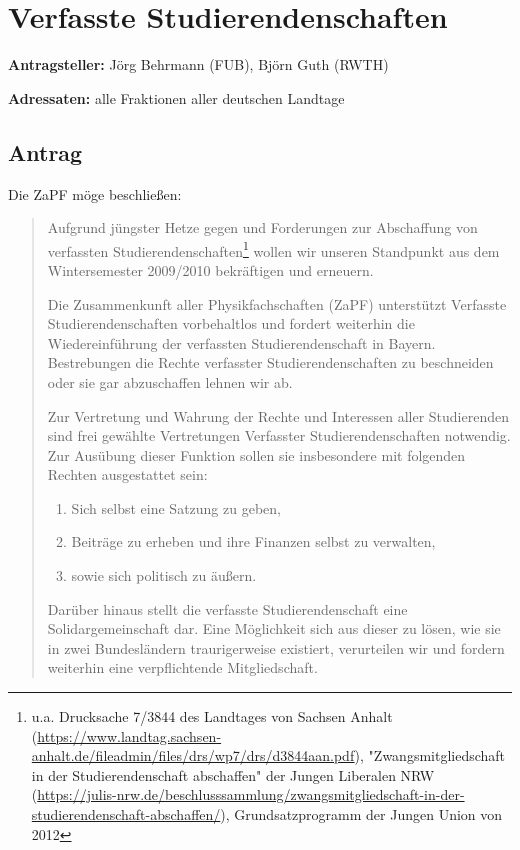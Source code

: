 \documentclass[draft,10pt,oneside]{scrartcl}
\begin{document}
\section*{Verfasste Studierendenschaften}

\textbf{Antragsteller:} Jörg Behrmann (FUB), Björn Guth (RWTH)

\textbf{Adressaten:} alle Fraktionen aller deutschen Landtage

\subsection*{Antrag}

Die ZaPF möge beschließen:

\begin{quote}
  Aufgrund jüngster Hetze gegen und Forderungen zur Abschaffung von verfassten
  Studierendenschaften\footnote{u.a. Drucksache 7/3844 des Landtages von Sachsen
    Anhalt
    (\url{https://www.landtag.sachsen-anhalt.de/fileadmin/files/drs/wp7/drs/d3844aan.pdf}),
  "Zwangsmitgliedschaft in der Studierendenschaft abschaffen" der Jungen
  Liberalen NRW
  (\url{https://julis-nrw.de/beschlusssammlung/zwangsmitgliedschaft-in-der-studierendenschaft-abschaffen/}),
  Grundsatzprogramm der Jungen Union von 2012}
  wollen wir unseren Standpunkt aus dem Wintersemester 2009/2010 bekräftigen und
  erneuern.

  Die Zusammenkunft aller Physikfachschaften (ZaPF) unterstützt Verfasste
  Studierendenschaften vorbehaltlos und fordert weiterhin die Wiedereinführung
  der verfassten Studierendenschaft in Bayern. Bestrebungen die Rechte
  verfasster Studierendenschaften zu beschneiden oder sie gar abzuschaffen
  lehnen wir ab.

  Zur Vertretung und Wahrung der Rechte und Interessen aller Studierenden sind
  frei gewählte Vertretungen Verfasster Studierendenschaften notwendig. Zur
  Ausübung dieser Funktion sollen sie insbesondere mit folgenden Rechten
  ausgestattet sein:
  \begin{enumerate}
  \item Sich selbst eine Satzung zu geben,
  \item Beiträge zu erheben und ihre Finanzen selbst zu verwalten,
  \item sowie sich politisch zu äußern.
  \end{enumerate}

  Darüber hinaus stellt die verfasste Studierendenschaft eine
  Solidargemeinschaft dar. Eine Möglichkeit sich aus dieser zu lösen, wie sie in
  zwei Bundesländern traurigerweise existiert, verurteilen wir und fordern
  weiterhin eine verpflichtende Mitgliedschaft.

\end{quote}
\end{document}
